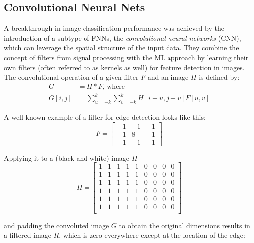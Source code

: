 \subsection{Convolutional Neural Nets}%
\label{sub:convolutional_neural_nets}

A breakthrough in image classification performance was achieved by the
introduction of a subtype of FNNs, the \emph{convolutional neural networks}
(CNN), which can leverage the spatial structure of the input data.  They
combine the concept of filters from signal processing with the ML approach by
learning their own filters (often referred to as kernels as well) for feature
detection in images.  The convolutional operation of a given filter $F$ and an
image $H$ is defined by:
\begin{align}
  G &= H * F \text{, where}\\
  G[i,j] &= \sum_{u=-k}^k \sum_{v=-k}^k H[i-u, j-v]F[u,v]
\end{align}

A well known example of a filter for edge detection looks like this:
\begin{equation}
  F = \begin{bmatrix} 
    -1 & -1 & -1 \\ 
    -1 & 8  & -1 \\ 
    -1 & -1 & -1  
  \end{bmatrix}
\end{equation}

Applying it to a (black and white) image $H$
\begin{equation}
  H = \begin{bmatrix}
	  1 & 1 & 1 & 1 & 1 & 0 & 0 & 0 & 0\\
	  1 & 1 & 1 & 1 & 1 & 0 & 0 & 0 & 0\\
	  1 & 1 & 1 & 1 & 1 & 0 & 0 & 0 & 0\\
	  1 & 1 & 1 & 1 & 1 & 0 & 0 & 0 & 0\\
	  1 & 1 & 1 & 1 & 1 & 0 & 0 & 0 & 0\\
	  1 & 1 & 1 & 1 & 1 & 0 & 0 & 0 & 0\\
	\end{bmatrix}
\end{equation}

and padding the convoluted image $G$ to obtain the original dimensions results
in a filtered image $R$, which is zero everywhere except at the location of the
edge:

